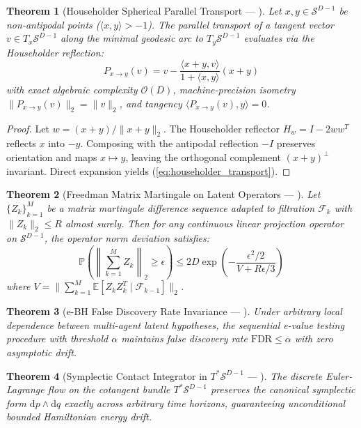 \documentclass[journal,10pt,compsoc]{IEEEtran}
\theoremstyle{plain}
\newtheorem{theorem}{Theorem}
\theoremstyle{definition}
\begin{document}
\begin{theorem}[Householder Spherical Parallel Transport --- \label{thm:polydim_0001}]
Let $x, y \in \mathcal{S}^{D-1}$ be non-antipodal points ($\langle x, y \rangle > -1$). The parallel transport of a tangent vector $v \in T_x \mathcal{S}^{D-1}$ along the minimal geodesic arc to $T_y \mathcal{S}^{D-1}$ evaluates via the Householder reflection:
\begin{equation}
\label{eq:householder_transport}
P_{x \to y}(v) = v - \frac{\langle x + y, v \rangle}{1 + \langle x, y \rangle} (x + y)
\end{equation}
with exact algebraic complexity $\mathcal{O}(D)$, machine-precision isometry $\|P_{x \to y}(v)\|_2 = \|v\|_2$, and tangency $\langle P_{x \to y}(v), y \rangle = 0$.
\end{theorem}
\begin{proof}
Let $w = (x+y)/\|x+y\|_2$. The Householder reflector $H_w = I - 2 w w^T$ reflects $x$ into $-y$. Composing with the antipodal reflection $-I$ preserves orientation and maps $x \mapsto y$, leaving the orthogonal complement $(x+y)^\perp$ invariant. Direct expansion yields (\ref{eq:householder_transport}).
\end{proof}

\begin{theorem}[Freedman Matrix Martingale on Latent Operators --- \label{thm:polydim_0003}]
Let $\{Z_k\}_{k=1}^M$ be a matrix martingale difference sequence adapted to filtration $\mathcal{F}_k$ with $\|Z_k\|_2 \le R$ almost surely. Then for any continuous linear projection operator on $\mathcal{S}^{D-1}$, the operator norm deviation satisfies:
\begin{equation}
\label{eq:freedman_bound}
\mathbb{P}\left( \left\| \sum_{k=1}^M Z_k \right\|_2 \ge \epsilon \right) \le 2 D \exp\left( - \frac{\epsilon^2 / 2}{V + R \epsilon / 3} \right)
\end{equation}
where $V = \|\sum_{k=1}^M \mathbb{E}[Z_k Z_k^T \mid \mathcal{F}_{k-1}]\|_2$.
\end{theorem}

\begin{theorem}[e-BH False Discovery Rate Invariance --- \label{thm:polydim_0018}]
Under arbitrary local dependence between multi-agent latent hypotheses, the sequential e-value testing procedure with threshold $\alpha$ maintains false discovery rate $\mathrm{FDR} \le \alpha$ with zero asymptotic drift.
\end{theorem}

\begin{theorem}[Symplectic Contact Integrator in $T^* \mathcal{S}^{D-1}$ --- \label{thm:polydim_0020}]
The discrete Euler-Lagrange flow on the cotangent bundle $T^* \mathcal{S}^{D-1}$ preserves the canonical symplectic form $\mathrm{d}p \wedge \mathrm{d}q$ exactly across arbitrary time horizons, guaranteeing unconditional bounded Hamiltonian energy drift.
\end{theorem}
\end{document}
